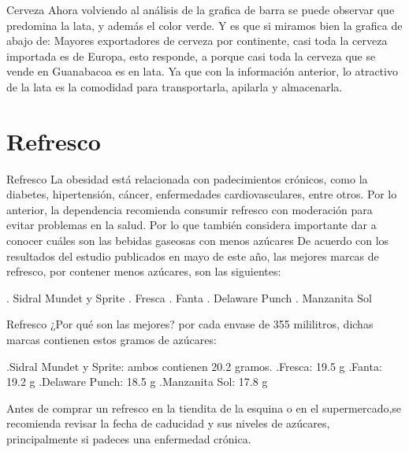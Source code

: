 \documentclass[11pt]{beamer}
\begin{document}
        \begin{frame}{Cerveza}
        		Ahora volviendo al análisis de la grafica de barra se puede observar que predomina la lata, y además el color verde. Y es que si miramos bien la grafica de abajo de: Mayores exportadores de cerveza por continente, casi toda la cerveza importada es de Europa, esto responde, a porque casi toda la cerveza que se vende en Guanabacoa es en lata. Ya que con la información anterior, lo atractivo de la lata es la comodidad para transportarla, apilarla y almacenarla.
        \end{frame}
    \section{Refresco}
	    \begin{frame}{Refresco}
	            La obesidad está relacionada con padecimientos crónicos, como la diabetes, hipertensión, cáncer, enfermedades cardiovasculares, entre otros. Por lo anterior, la dependencia recomienda consumir refresco con moderación para evitar problemas en la salud. Por lo que también considera importante dar a conocer cuáles son las bebidas gaseosas con menos azúcares
	            De acuerdo con los resultados del estudio publicados en mayo de este año, las mejores marcas de refresco, por contener menos azúcares, son las siguientes:
	            
	            . Sidral Mundet y Sprite
	            . Fresca
	            . Fanta
	            . Delaware Punch
	            . Manzanita Sol
	            
	    \end{frame}
	
    	\begin{frame}{Refresco}
 	   ¿Por qué son las mejores? por cada envase de 355 mililitros, dichas marcas contienen estos gramos de azúcares:
 	   
 	   .Sidral Mundet y Sprite: ambos contienen 20.2 gramos.
 	   .Fresca: 19.5 g
 	   .Fanta: 19.2 g
 	   .Delaware Punch: 18.5 g
 	   .Manzanita Sol: 17.8 g
 	   
 	   Antes de comprar un refresco en la tiendita de la esquina o en el supermercado,se recomienda revisar la fecha de caducidad y sus niveles de azúcares, principalmente si padeces una enfermedad crónica.
 	   
        \end{frame}
\end{document}
